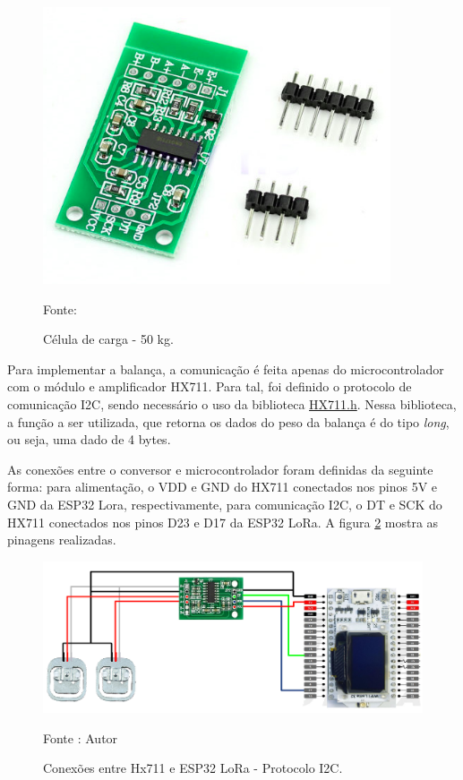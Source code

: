 \begin{figure}[H]
  \centering
  \includegraphics[scale=0.6]{figuras/conversorHX711.png}
  \caption{Célula de carga - 50 kg.}
  {\footnotesize Fonte: \cite{figura_HX711}} 
  \label{fig:conversorHX711}
\end{figure}

Para implementar a balança, a comunicação é feita apenas do microcontrolador com o módulo e amplificador HX711. Para tal, foi definido o protocolo de comunicação I2C, sendo necessário o uso da biblioteca \href{https://github.com/bogde/HX711}{HX711.h}. Nessa biblioteca, a função a ser utilizada,  que retorna os dados do peso da balança é do tipo \textit{long}, ou seja, uma dado de 4 bytes.

As conexões entre o conversor e microcontrolador foram definidas da seguinte forma: para alimentação, o VDD e GND do HX711 conectados nos pinos 5V e GND da ESP32 Lora, respectivamente, para comunicação I2C, o DT e SCK do HX711 conectados nos pinos D23 e D17 da ESP32 LoRa. A figura \ref{fig:PINAGEM_balanca} mostra as pinagens realizadas.  

\begin{figure}[H]
  \centering
  \includegraphics[scale=0.4]{figuras/PINAGEM_BALANCA.png}
  \caption{Conexões entre Hx711 e ESP32 LoRa - Protocolo I2C.} 
  {\footnotesize Fonte : Autor } 
  \label{fig:PINAGEM_balanca}
\end{figure}


